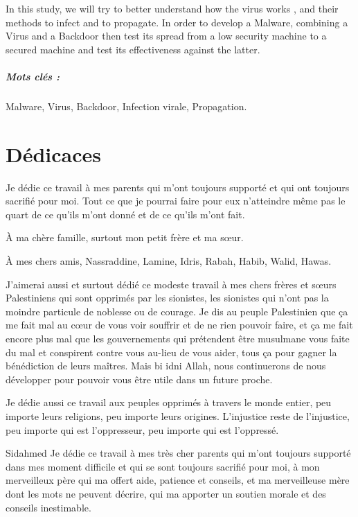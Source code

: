 In this study, we will try to better understand how the virus works , and their methods to infect and to propagate. In order to develop a Malware, combining a Virus and a Backdoor then test its spread from a low security machine to a secured machine and test its effectiveness against the latter. %

\paragraph{Mots clés :} Malware, Virus, Backdoor, Infection virale, Propagation.


\chapter*{Dédicaces}
Je dédie ce travail à mes parents qui m'ont toujours supporté et qui ont toujours sacrifié pour moi. Tout ce que
je pourrai faire pour eux n'atteindre même pas le quart de ce qu'ils m'ont donné et de ce qu'ils m'ont fait.

À ma chère famille, surtout mon petit frère et ma sœur.

À mes chers amis, Nassraddine, Lamine, Idris, Rabah, Habib, Walid, Hawas.

J'aimerai aussi et surtout dédié ce modeste travail à mes chers frères et sœurs Palestiniens qui sont opprimés par les
sionistes, les sionistes qui n'ont pas la moindre particule de noblesse ou de courage. Je dis au peuple Palestinien
que ça me fait mal au cœur de vous voir souffrir et de ne rien pouvoir faire, et ça me fait encore plus mal que 
les gouvernements qui prétendent être musulmane vous faite du mal et conspirent contre vous au-lieu de vous aider, tous 
ça pour gagner la bénédiction de leurs maîtres. 
Mais bi idni Allah, nous continuerons de nous développer pour pouvoir vous être utile dans un future proche.

Je dédie aussi ce travail aux peuples opprimés à travers le monde entier, peu importe leurs religions, peu importe
leurs origines. L'injustice reste de l'injustice, peu importe qui est l'oppresseur, peu importe qui est l'oppressé.

\vfill
Sidahmed
\vfill
\newpage
Je dédie ce travail à mes très cher parents qui m'ont toujours supporté dans mes moment difficile et qui se sont toujours sacrifié pour moi, à mon merveilleux père qui ma offert aide, patience et conseils, et ma merveilleuse mère dont les mots ne peuvent décrire, qui ma apporter un soutien morale et des conseils inestimable.

